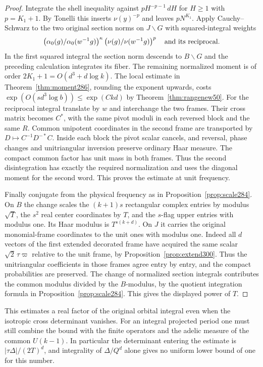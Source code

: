 \documentclass[a4paper,11pt]{article}
\theoremstyle{definition}
\theoremstyle{remark}
\numberwithin{equation}{section}
\begin{document}
\begin{proof}
Integrate the shell inequality against \(pH^{-p-1}\,dH\)
for \(H\ge1\) with \(p=K_1+1\). By Tonelli this inserts
\(\nu(y)^{-p}\) and leaves \(pN^{K_1}\).
Apply Cauchy--Schwarz to the two original section norms on
\(J\backslash G\) with squared-integral weights
\[
       \left(\alpha_0(g)/\alpha_0(w^{-1}g)\right)^\kappa
       \left(\nu(g)/\nu(w^{-1}g)\right)^p
       \quad\hbox{and its reciprocal}.
\]
In the first squared integral the section norm descends to
\(B\backslash G\) and the preceding calculation integrates
its fiber. The remaining normalized moment is of order
\(2K_1+1=O(d^3+d\log k)\). The local estimate in
Theorem~\ref{thm:moment286}, rounding the exponent upwards,
costs \(\exp(O(sd^3\log b))\le\exp(Ckd)\) by
Theorem~\ref{thm:rangenew50}. For the reciprocal integral
translate by \(w\) and interchange the two frames. Their cross
matrix becomes \(C^*\), with the same pivot moduli in each
reversed block and the same \(R\). Common unipotent coordinates
in the second frame are transported by \(D\mapsto C^{-1}D^{-*}C\).
Inside each block the pivot scalar cancels, and reversal, phase
changes and unitriangular inversion preserve ordinary Haar
measure. The compact common factor has unit mass in both
frames. Thus the second disintegration has exactly the required
normalization and uses the diagonal moment for the second word.
This proves the estimate at unit frequency.

Finally conjugate from the physical frequency as in
Proposition~\ref{prop:scale284}. On \(B\) the change scales
the \((k+1)s\) rectangular complex entries by modulus
\(\sqrt T\), the \(s^2\) real center coordinates by \(T\),
and the \(s\)-flag upper entries with modulus one.
Its Haar modulus is \(T^{s(k+d)}\).
On \(J\) it carries the original monomial-frame coordinates
to the unit ones with modulus one. Indeed all \(d\) vectors of the
first extended decorated frame have acquired the same scalar
\(\sqrt2\,\tau\varpi\) relative to the unit frame, by
Proposition~\ref{prop:extend300}. Thus the unitriangular
coefficients in those frames agree entry by entry, and the
compact probabilities are preserved. The change of normalized
section integrals contributes the common modulus divided by
the \(B\)-modulus, by the quotient integration formula in
Proposition~\ref{prop:scale284}. This gives the displayed
power of \(T\).
\end{proof}

This estimates a real factor of the original orbital integral
even when the isotropic cross determinant vanishes. For an
integral projected period one must still combine the bound
with the finite operators and the adelic measure of the common
\(U(k-1)\). In particular the determinant entering the estimate
is \(|\tau\Delta|/(2T)^d\), and integrality of \(\Delta/Q^d\)
alone gives no uniform lower bound of one for this number.
\end{document}
